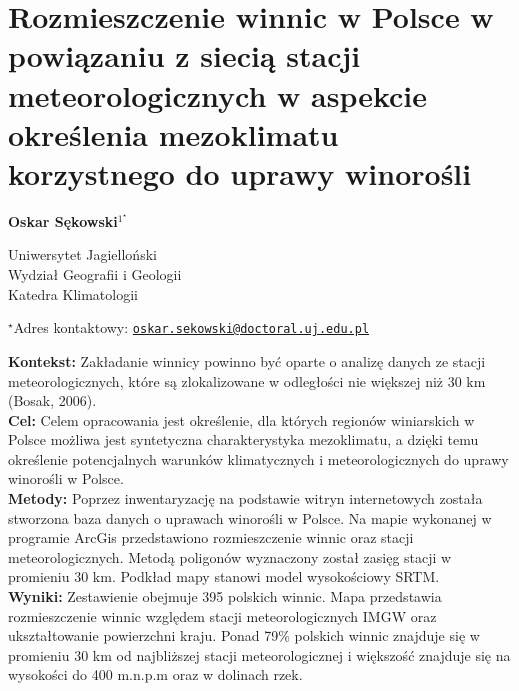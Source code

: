 \documentclass[\main/boa.tex]{subfiles}
\begin{document}
\section{Rozmieszczenie winnic w Polsce w powiązaniu z siecią stacji meteorologicznych w aspekcie określenia mezoklimatu korzystnego do uprawy winorośli}

\begin{center}
  {\bf {} Oskar Sękowski$^{1^\star}$}
\end{center}

\vskip 0.3cm

\begin{affiliations}
\begin{enumerate}
\begin{minipage}{0.915\textwidth}
\centering
\item Uniwersytet Jagielloński \\ Wydział Geografii i Geologii \\ Katedra Klimatologii\\[-2pt]
\end{minipage}
\end{enumerate}
$^\star$Adres kontaktowy: \href{mailto:oskar.sekowski@doctoral.uj.edu.pl}{\nolinkurl{oskar.sekowski@doctoral.uj.edu.pl}}\\
\end{affiliations}

\vskip 0.5cm


\vskip 0.5cm

\textbf{Kontekst:} Zakładanie winnicy powinno być oparte o analizę danych ze stacji meteorologicznych, które są zlokalizowane w odległości nie większej niż 30 km (Bosak, 2006).\\
\textbf{Cel:} Celem opracowania jest określenie, dla których regionów winiarskich w Polsce możliwa jest syntetyczna charakterystyka mezoklimatu, a dzięki temu określenie potencjalnych warunków klimatycznych i meteorologicznych do uprawy winorośli w Polsce.\\
\textbf{Metody:} Poprzez inwentaryzację na podstawie witryn internetowych została stworzona baza danych o uprawach winorośli w Polsce. Na mapie wykonanej w programie ArcGis przedstawiono rozmieszczenie winnic oraz stacji meteorologicznych. Metodą poligonów wyznaczony został zasięg stacji w promieniu 30 km. Podkład mapy stanowi model wysokościowy SRTM.\\
\textbf{Wyniki:} Zestawienie obejmuje 395 polskich winnic. Mapa przedstawia rozmieszczenie winnic względem stacji meteorologicznych IMGW oraz ukształtowanie powierzchni kraju. Ponad 79\% polskich winnic znajduje się w promieniu 30 km od najbliższej stacji meteorologicznej i większość znajduje się na wysokości do 400 m.n.p.m oraz w dolinach rzek. 
\end{document}
